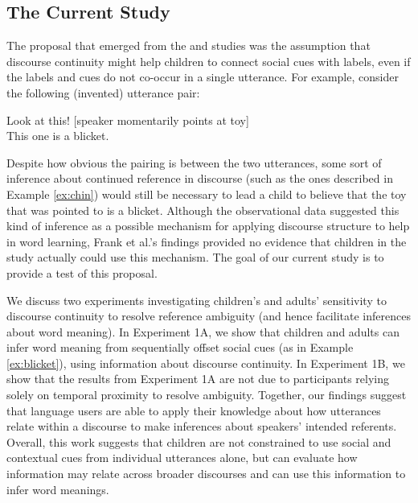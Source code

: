 \documentclass[man]{apa2}
\begin{document}
\subsection{The Current Study}

The proposal that emerged from the  and  studies was the assumption that discourse continuity might help children to connect social cues with labels, even if the labels and cues do not co-occur in a single utterance.  For example, consider the following (invented) utterance pair:

\begin{example}
\label{ex:blicket}
Look at this! [speaker momentarily points at toy] \\
This one is a blicket.
\end{example}

\noindent Despite how obvious the pairing is between the two utterances, some sort of inference about continued reference in discourse (such as the ones described in Example \ref{ex:chin}) would still be necessary to lead a child to believe that the toy that was pointed to is a blicket.  Although the observational data suggested this kind of inference as a possible mechanism for applying discourse structure to help in word learning, Frank et al.'s findings provided no evidence that children in the study actually could use this mechanism.  The goal of our current study is to provide a test of this proposal. 

We discuss two experiments investigating children's and adults' sensitivity to discourse continuity to resolve reference ambiguity (and hence facilitate inferences about word meaning). In Experiment 1A, we show that children and adults can infer word meaning from sequentially offset social cues (as in Example \ref{ex:blicket}), using information about discourse continuity.  In Experiment 1B, we show that the results from Experiment 1A are not due to participants relying solely on temporal proximity to resolve ambiguity.  Together, our findings suggest that language users are able to apply their knowledge about how utterances relate within a discourse to make inferences about speakers' intended referents.  Overall, this work suggests that children are not constrained to use social and contextual cues from individual utterances alone, but can evaluate how information may relate across broader discourses and can use this information to infer word meanings.
\end{document}

